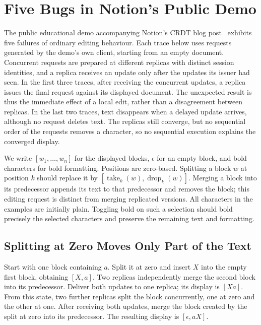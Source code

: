 \section{Five Bugs in Notion's Public Demo}
\label{app:notion-bugs}

The public educational demo accompanying Notion's CRDT blog
post~\cite{NotionCRDTBlog,NotionCRDTDemo} exhibits five failures of ordinary
editing behaviour. Each trace below uses requests generated by the
demo's own client, starting from an empty document. Concurrent requests are
prepared at different replicas with distinct session identities, and a replica
receives an update only after the updates its issuer had seen. In the first
three traces, after receiving the concurrent updates, a replica issues the
final request against its displayed document. The unexpected result is thus
the immediate effect of a local edit, rather than a disagreement between
replicas. In the last two traces, text disappears when a delayed update
arrives, although no request deletes text. The replicas still converge, but
no sequential order of the requests removes a character, so no sequential
execution explains the converged display.

We write $[w_1,\ldots,w_n]$ for the displayed blocks, $\epsilon$ for an
empty block, and bold characters for bold formatting. Positions are
zero-based. Splitting a block $w$ at position $k$ should replace it by
$[\operatorname{take}_k(w),\operatorname{drop}_k(w)]$.
Merging a block into its predecessor appends its text to that predecessor
and removes the block; this editing request is distinct from merging
replicated versions. All characters in the examples are initially plain.
Toggling bold on such a selection should bold precisely the selected
characters and preserve the remaining text and formatting.

\subsection{Splitting at Zero Moves Only Part of the Text}
\label{app:notion-split-bug}

Start with one block containing $a$. Split it at zero and insert $X$ into
the empty first block, obtaining $[X,a]$. Two replicas independently merge
the second block into its predecessor. Deliver both updates to one replica;
its display is $[Xa]$. From this state, two further replicas split the block
concurrently, one at zero and the other at one. After receiving both
updates, merge the block created by the split at zero into its predecessor.
The resulting display is $[\epsilon,aX]$.

